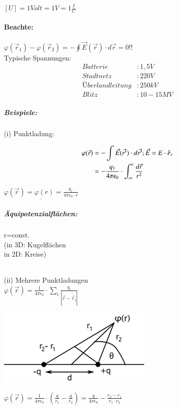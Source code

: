 \documentclass[11pt]{article}
\begin{document}
$[U]= 1Volt = 1V = 1\frac{I}{C}$\\

\paragraph{Beachte:} $ \varphi(\vec{r}_1)-\varphi(\vec{r}_2) = -\oint \vec{E}(\vec{r})\cdot d\vec{r}= 0!!$\\

Typische Spannungen:
\begin{align*}
	Batterie&: 1,5V\\
	Stadtnetz&: 220V\\
	Überlandleitung&: 250kV\\
	Blitz&: 10-15MV
\end{align*}

\subparagraph{Beispiele:}

(i) Punktladung:

\begin{align*}
	\displaystyle \varphi(\vec{r})&= -\int \vec{E}(\vec{r'})\cdot d\vec{r'}; \vec{E}=E\cdot\hat{e}_r\\
	\displaystyle &=-\frac{q_1}{4\pi\epsilon_0}\cdot\int_{\infty}^{r} \frac{d\vec{r}}{r^2}
\end{align*}

$\underline{\varphi(\vec{r})=\varphi(r)=\frac{q_1}{4\pi\epsilon_0\cdot r}}$\\

\subparagraph{Äquipotenzialflächen:} r=const.\\
(in 3D: Kugelflächen\\
in 2D: Kreise)

\hfill\\

(ii) Mehrere Punktladungen\\

$\displaystyle\varphi(\vec{r})=\frac{1}{4\pi\epsilon_0}\cdot\sum_{i} \frac{q_i}{|\vec{r}-\tilde{\vec{r}}_i|}$

\includegraphics{skizzen/14/14_7B0}

$ \varphi(\vec{r})=\frac{1}{4\pi\epsilon_0}\cdot(\frac{q}{r_1}-\frac{q}{r_2})=\frac{q}{4\pi\epsilon_0}-\frac{r_2-r_1}{r_1\cdot r_2} $
\end{document}
